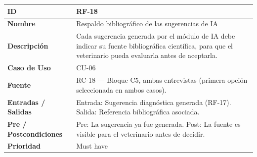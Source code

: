 \documentclass[
]{article}
\newcounter{none} %
\begin{document}
{\def\LTcaptype{none} %
\begin{longtable}[]{|
  >{\raggedright\arraybackslash}p{}|
  >{\raggedright\arraybackslash}p{}|}
\hline
\begin{minipage}[b]{\linewidth}\raggedright
\textbf{ID}
\end{minipage} & \begin{minipage}[b]{\linewidth}\raggedright
RF-18
\end{minipage} \\
\hline
\endhead
\hline
\endlastfoot
\textbf{Nombre} & \begin{minipage}[t]{\linewidth}\raggedright
Respaldo bibliográfico de las sugerencias de IA
\end{minipage} \\
\hline
\textbf{Descripción} & \begin{minipage}[t]{\linewidth}\raggedright
Cada sugerencia generada por el módulo de IA debe indicar su fuente bibliográfica científica, para que el veterinario pueda evaluarla antes de aceptarla.
\end{minipage} \\
\hline
\textbf{Caso de Uso} & \begin{minipage}[t]{\linewidth}\raggedright
CU-06
\end{minipage} \\
\hline
\textbf{Fuente} & \begin{minipage}[t]{\linewidth}\raggedright
RC-18 — Bloque C5, ambas entrevistas (primera opción seleccionada en ambos casos).
\end{minipage} \\
\hline
\textbf{Entradas / Salidas} & \begin{minipage}[t]{\linewidth}\raggedright
Entrada: Sugerencia diagnóstica generada (RF-17). Salida: Referencia bibliográfica asociada.
\end{minipage} \\
\hline
\textbf{Pre / Postcondiciones} & \begin{minipage}[t]{\linewidth}\raggedright
Pre: La sugerencia ya fue generada. Post: La fuente es visible para el veterinario antes de decidir.
\end{minipage} \\
\hline
\textbf{Prioridad} & \begin{minipage}[t]{\linewidth}\raggedright
Must have
\end{minipage} \\

\end{longtable}}
\end{document}
